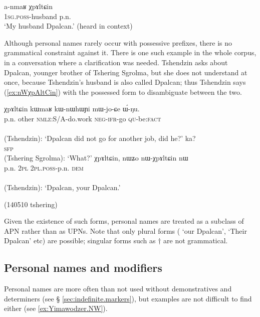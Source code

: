 \begin{exe}
\ex \label{ex:anmaR.dpalcan}
\gll a-nmaʁ χpɤltɕin \\
\textsc{1sg}.\textsc{poss}-husband p.n. \\
\glt `My husband Dpalcan.' (heard in context)
\end{exe}

Although personal names rarely occur with possessive prefixes, there is no grammatical constraint against it. There is one such example in the whole corpus, in a conversation where a clarification was needed. Tshendzin asks about Dpalcan, younger brother of Tshering Sgrolma, but she does not understand at once, because Tshendzin's husband is also called Dpalcan; thus Tshendzin says (\ref{ex:nWχpAltCin}) with the possessed form  to disambiguate between the two. 

\begin{exe}
\ex   
\begin{xlist}
\ex 
\gll χpɤltɕin kɯmaʁ kɯ-nɯhɯɲi mɯ-jo-ɕe ɯ́-ŋu. \\
p.n. other \textsc{nmlz}:S/A-do.work \textsc{neg}-\textsc{ifr}-go \textsc{qu}-be:\textsc{fact} \\
\\
\glt (Tshendzin): `Dpalcan did not go for another job, did he?'
\ex 
\gll ka? \\
\textsc{sfp} \\
\glt  (Tshering Sgrolma): `What?'
\ex  \label{ex:nWχpAltCin}
\gll χpɤltɕin, nɯʑo nɯ-χpɤltɕin nɯ \\
p.n. \textsc{2pl} \textsc{2pl}.\textsc{poss}-p.n. \textsc{dem} \\
\\
\glt (Tshendzin): `Dpalcan, your Dpalcan.'  
\end{xlist}
\glt  (140510 tshering)
\end{exe}

Given the existence of such forms, personal names are treated as a subclass of APN rather than as UPNs. Note that only plural forms ( `our Dpalcan',  `Their Dpalcan' etc) are possible; singular forms such as $\dagger$ are not grammatical.
 
\subsection{Personal names and modifiers} \label{sec:personal.names.modifiers}
Personal names are more often than not used without demonstratives and determiners (see § \ref{sec:indefinite.markers}), but examples are not difficult to find either (see \ref{ex:Yimawodzer.NW}).

